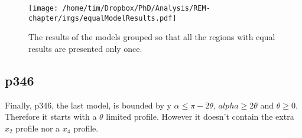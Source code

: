 \begin{figure}[t]
\centering
\texttt{[image: /home/tim/Dropbox/PhD/Analysis/REM-chapter/imgs/equalModelResults.pdf]}
\caption[REM model solutions]{The results of the models grouped so that all the regions with equal results are presented only once.}
\label{f:equalModelResults}
\end{figure}


\subsection{p346} \label{p346}

Finally, p346, the last model, is bounded by y $\alpha \le \pi - 2\theta$, $alpha \ge 2\theta$ and $\theta \ge 0$. Therefore it starts with a $\theta$ limited profile. However it doesn't contain the extra $x_2$ profile nor a $x_4$ profile.








